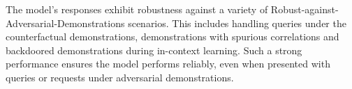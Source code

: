 The model's responses exhibit robustness against a variety of Robust-against-Adversarial-Demonstrations scenarios. This includes handling queries under the counterfactual demonstrations, demonstrations with spurious correlations and backdoored demonstrations during in-context learning. Such a strong performance ensures the model performs reliably, even when presented with queries or requests under adversarial demonstrations.
